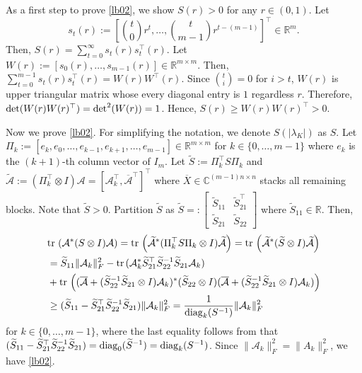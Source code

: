 \documentclass[preprint,5p,times,twocolumn]{elsarticle}
\def\tr{{\rm tr} \hspace{0.5mm}}
\begin{document}
 As a first step to prove \eqref{lb02}, we show $S(r) > 0$ for any $r \in (0,1)$.  
 Let
 \[
 s_t(r) := \left[\binom{t}{0}r^t, \ldots, \binom{t}{m-1}r^{t-(m-1)}\right]^{\top} \in \mathbb R^m. 
 \]
 Then, $S(r) = \sum_{t=0}^{\infty}s_t(r)s^{\top}_t(r)$. Let $W(r) := \left[s_0(r), \dots, s_{m-1}(r)\right] \in \mathbb R^{m \times m}$. Then, $\sum_{t=0}^{m-1}s_t(r)s_t^{\top}(r) = W(r)W^{\top}(r)$. Since $\binom{t}{i}=0$ for $i>t$, $W(r)$ is upper triangular matrix whose every diagonal entry is $1$ regardless $r$. Therefore, ${\rm det}(W(r)W(r)^{\top}) = {\rm det}^2(W(r))=1$. Hence, $S(r) \geq W(r)W(r)^{\top} > 0$. 

 Now we prove \eqref{lb02}. For simplifying the notation, we denote $S(|\lambda_K|)$ as $S$. 
Let $\Pi_k := [e_k, e_0, \dots, e_{k-1}, e_{k+1}, \dots, e_{m-1}]\in\mathbb{R}^{m\times m}$ for $k \in \{0, \dots,m-1\}$ where $e_k$ is the $(k+1)$-th column vector of $I_m$. Let $\widetilde S := \Pi_k^\top S\Pi_k$ and $\widetilde{\mathcal A} := (\Pi_k^{\top}\otimes I) {\mathcal A} = [{\mathcal A}_k^{\top}, \overline{{\mathcal A}}^{\top}]^{\top}$ where $\overline{X}\in\mathbb{C}^{(m-1)n\times n}$ stacks all remaining blocks. Note that $\widetilde{S} > 0$. Partition $\widetilde{S}$ as $\widetilde{S} =: \left[\begin{array}{cc} \widetilde{S}_{11} & \widetilde{S}_{21}^{\top} \\ \widetilde{S}_{21} & \widetilde{S}_{22}\end{array}\right]$ where $\widetilde{S}_{11} \in \mathbb R$. Then, 
 \begin{align}
     &\tr \left({\mathcal A}^*(S \otimes I){\mathcal A}\right) = \tr \left(\widetilde{{\mathcal A}}^*(\Pi_k^{\top} S \Pi_k \otimes I)\widetilde{{\mathcal A}}\right) = \tr \left(\widetilde{{\mathcal A}}^*(\widetilde{S} \otimes I)\widetilde{{\mathcal A}}\right) \nonumber \\
     &=\widetilde{S}_{11}\|{\mathcal A}_k\|_F^2 - \tr({\mathcal A}_k^*\widetilde{S}_{21}^{\top}\widetilde{S}_{22}^{-1}\widetilde{S}_{21}{\mathcal A}_k)  \nonumber \\
     &+ \tr\left((\overline{{\mathcal A}}+(\widetilde{S}_{22}^{-1}\widetilde{S}_{21}\otimes I){\mathcal A}_k)^*(\widetilde{S}_{22}\otimes I)(\overline{{\mathcal A}}+(\widetilde{S}_{22}^{-1}\widetilde{S}_{21}\otimes I){\mathcal A}_k)\right) \nonumber \\
     & \geq (\widetilde{S}_{11} - \widetilde{S}_{21}^{\top}\widetilde{S}_{22}^{-1}\widetilde{S}_{21})\|{\mathcal A}_k\|_F^2 = \frac{1}{{\rm diag}_k(S^{-1})}\|{\mathcal A}_k\|_F^2  \label{tttt2}
 \end{align}
 for $k \in \{0, \dots, m-1\}$, where the last equality follows from that $(\widetilde{S}_{11} - \widetilde{S}_{21}^{\top}\widetilde{S}_{22}^{-1}\widetilde{S}_{21}) = {\rm diag}_0(\widetilde{S}^{-1}) = {\rm diag}_k({S}^{-1})$. Since $\|\mathcal A_k\|_F^2 = \|A_k\|_F^2$, we have \eqref{lb02}. 
\end{document}
